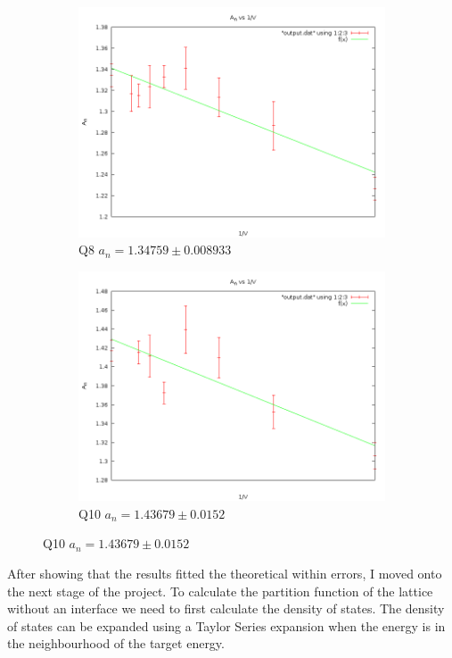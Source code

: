 \documentclass[10pt,a4paper]{article}
\begin{document}
\begin{figure}[H]
\begin{subfigure}[b]{0.45\textwidth}
    \includegraphics[width=\textwidth]{q8variousgrid.png}
    \caption{Q8 $a_n = 1.34759 \pm 0.008933$}
\end{subfigure}
\begin{subfigure}[b]{0.45\textwidth}
    \includegraphics[width=\textwidth]{q10variousgrid.png}
    \caption{Q10 $a_n = 1.43679 \pm 0.0152$}
\end{subfigure}
\end{figure}

After showing that the results fitted the theoretical within errors, I moved onto the next stage of the project.
To calculate the partition function of the lattice without an interface we need to first calculate the density of states.
The density of states can be expanded using a Taylor Series expansion when the energy is in the neighbourhood of the target energy.
\end{document}
